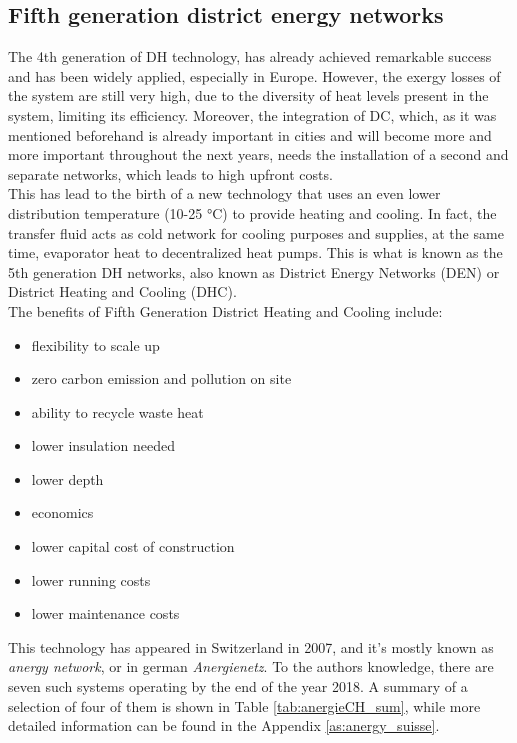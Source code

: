 \documentclass{article}
\begin{document}
\subsection{Fifth generation district energy networks}\label{ss:5gden}
The 4th generation of DH technology, has already achieved remarkable success and has been widely applied, especially in Europe. However, the exergy losses of the system are still very high, due to the diversity of heat levels present in the system, limiting its efficiency. Moreover, the integration of DC, which, as it was mentioned beforehand is already important in cities and will become more and more important throughout the next years, needs the installation of a second and separate networks, which leads to high upfront costs. \\
This has lead to the birth of a new technology that uses an even lower distribution temperature (10-25 \si{\celsius}) to provide heating and cooling. In fact, the transfer fluid acts as cold network for cooling purposes and supplies, at the same time, evaporator heat to decentralized heat pumps. This is what is known as the 5th generation DH networks, also known as District Energy Networks (DEN) or District Heating and Cooling (DHC).\\

The benefits of Fifth Generation District Heating and Cooling include:
\begin{itemize}
	\item flexibility to scale up
	\item zero carbon emission and pollution on site
	\item ability to recycle waste heat
	\item lower insulation needed 
	\item lower depth
	\item economics
	\item lower capital cost of construction
	\item lower running costs
	\item lower maintenance costs
\end{itemize}

This technology has appeared in Switzerland in 2007, and it's mostly known as \textit{anergy network}, or in german \textit{Anergienetz}. To the authors knowledge, there are seven such systems operating by the end of the year 2018\cite{energieschweizFallbeispieleThermischeNetze2018}. A summary of a selection of four of them is shown in Table \ref{tab:anergieCH_sum}, while more detailed information can be found in the Appendix \ref{as:anergy_suisse}.
\end{document}
